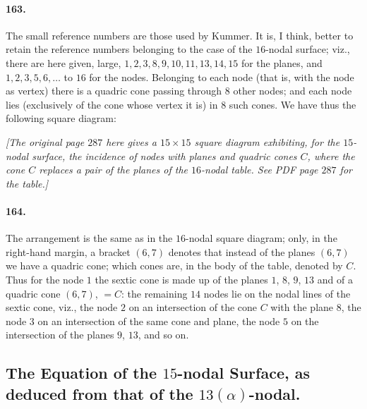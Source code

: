 \documentclass[11pt,a4paper]{article}
\begin{document}
\paragraph{163.}
The small reference numbers are those used by Kummer. It is, I think,
better to retain the reference numbers belonging to the case of the
$16$-nodal surface; viz., there are here given, large, $1, 2, 3, 8, 9,
10, 11, 13, 14, 15$ for the planes, and $1, 2, 3, 5, 6, \dotsc$ to $16$
for the nodes. Belonging to each node (that is, with the node as vertex)
there is a quadric cone passing through $8$ other nodes; and each node
lies (exclusively of the cone whose vertex it is) in $8$ such cones. We
have thus the following square diagram:

\bigskip

\begin{center}
\textit{[The original page $287$ here gives a $15 \times 15$ square
diagram exhibiting, for the $15$-nodal surface, the incidence of nodes
with planes and quadric cones $C$, where the cone $C$ replaces a pair of
the planes of the $16$-nodal table. See PDF page $287$ for the table.]}
\end{center}

\bigskip

\paragraph{164.}
The arrangement is the same as in the $16$-nodal square diagram; only, in
the right-hand margin, a bracket $(6, 7)$ denotes that instead of the
planes $(6, 7)$ we have a quadric cone; which cones are, in the body of
the table, denoted by $C$. Thus for the node $1$ the sextic cone is made
up of the planes $1$, $8$, $9$, $13$ and of a quadric cone $(6, 7)$,
$= C$: the remaining $14$ nodes lie on the nodal lines of the sextic
cone, viz., the node $2$ on an intersection of the cone $C$ with the
plane $8$, the node $3$ on an intersection of the same cone and plane,
the node $5$ on the intersection of the planes $9$, $13$, and so on.

\subsection*{The Equation of the $15$-nodal Surface, as deduced from that
of the $13(\alpha)$-nodal.}
\end{document}
